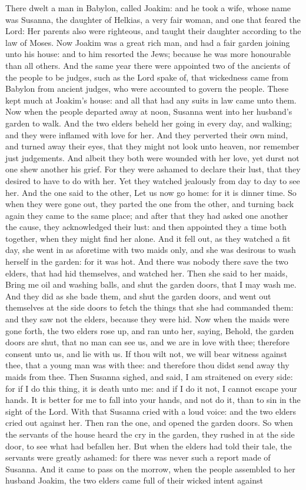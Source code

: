  There dwelt a man in Babylon, called Joakim: and he took a wife, whose name was Susanna, the daughter of Helkias, a very fair woman, and one that feared the Lord: Her parents also were righteous, and taught their daughter according to the law of Moses. Now Joakim was a great rich man, and had a fair garden joining unto his house: and to him resorted the Jews; because he was more honourable than all others. And the same year there were appointed two of the ancients of the people to be judges, such as the Lord spake of, that wickedness came from Babylon from ancient judges, who were accounted to govern the people. These kept much at Joakim’s house: and all that had any suits in law came unto them. Now when the people departed away at noon, Susanna went into her husband’s garden to walk. And the two elders beheld her going in every day, and walking; and they were inflamed with love for her. And they perverted their own mind, and turned away their eyes, that they might not look unto heaven, nor remember just judgements. And albeit they both were wounded with her love, yet durst not one shew another his grief. For they were ashamed to declare their lust, that they desired to have to do with her. Yet they watched jealously from day to day to see her. And the one said to the other, Let us now go home: for it is dinner time. So when they were gone out, they parted the one from the other, and turning back again they came to the same place; and after that they had asked one another the cause, they acknowledged their lust: and then appointed they a time both together, when they might find her alone. And it fell out, as they watched a fit day, she went in as aforetime with two maids only, and she was desirous to wash herself in the garden: for it was hot. And there was nobody there save the two elders, that had hid themselves, and watched her. Then she said to her maids, Bring me oil and washing balls, and shut the garden doors, that I may wash me. And they did as she bade them, and shut the garden doors, and went out themselves at the side doors to fetch the things that she had commanded them: and they saw not the elders, because they were hid. Now when the maids were gone forth, the two elders rose up, and ran unto her, saying, Behold, the garden doors are shut, that no man can see us, and we are in love with thee; therefore consent unto us, and lie with us. If thou wilt not, we will bear witness against thee, that a young man was with thee: and therefore thou didst send away thy maids from thee. Then Susanna sighed, and said, I am straitened on every side: for if I do this thing, it is death unto me: and if I do it not, I cannot escape your hands. It is better for me to fall into your hands, and not do it, than to sin in the sight of the Lord. With that Susanna cried with a loud voice: and the two elders cried out against her. Then ran the one, and opened the garden doors. So when the servants of the house heard the cry in the garden, they rushed in at the side door, to see what had befallen her. But when the elders had told their tale, the servants were greatly ashamed: for there was never such a report made of Susanna. And it came to pass on the morrow, when the people assembled to her husband Joakim, the two elders came full of their wicked intent against 